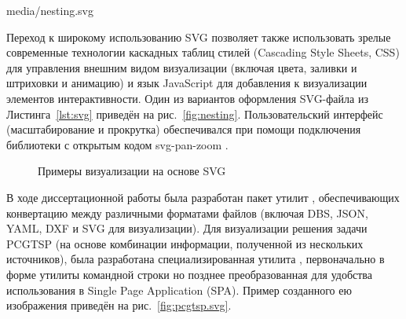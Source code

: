 
  {media/nesting.svg}

Переход к широкому использованию SVG
позволяет также использовать зрелые современные технологии
каскадных таблиц стилей
(Cascading Style Sheets, CSS)
для управления внешним видом визуализации
(включая цвета, заливки и штриховки и анимацию)
и язык JavaScript
для добавления к визуализации
элементов интерактивности.
Один из вариантов оформления
SVG-файла из Листинга~\ref{lst:svg}
приведён на рис.~\ref{fig:nesting}.
Пользовательский интерфейс
(масштабирование и прокрутка)
обеспечивался при помощи подключения
библиотеки с открытым кодом
svg-pan-zoom
\autocite*{bi:svg-pan-zoom}.

\begin{figure}
  \centering
  \caption{Примеры визуализации на основе SVG}
  \label{fig:using-svg}
\end{figure}

В ходе диссертационной работы
была разработан пакет утилит
\cite{bi:dbs2json},
обеспечивающих конвертацию между
различными форматами файлов
(включая DBS, JSON, YAML, DXF и SVG для визуализации).
Для визуализации решения задачи PCGTSP
(на основе комбинации информации,
полученной из нескольких источников),
была разработана специализированная утилита
\cite{bi:j2pcgtsp},
первоначально в форме утилиты командной строки
но позднее преобразованная
для удобства использования в
Single Page Application
(SPA).
Пример созданного ею изображения
приведён на рис.~\ref{fig:pcgtsp.svg}.
